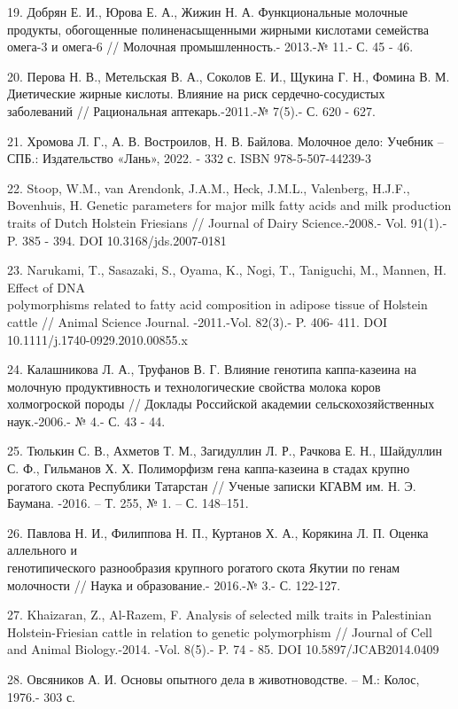 \begin{noparindent}
19. Добрян Е. И., Юрова Е. А., Жижин Н. А. Функциональные молочные
продукты, обогощенные полиненасыщенными жирными кислотами семейства
омега-3 и омега-6 // Молочная промышленность.- 2013.-№ 11.- С. 45 - 46.

20. Перова Н. В., Метельская В. А., Соколов Е. И., Щукина Г. Н., Фомина
В. М. Диетические жирные кислоты. Влияние на риск сердечно-сосудистых
заболеваний // Рациональная аптекарь.-2011.-№ 7(5).- С. 620 - 627.

21. Хромова Л. Г., А. В. Востроилов, Н. В. Байлова. Молочное дело:
Учебник -- СПБ.: Издательство «Лань», 2022. - 332 с. ISBN
978-5-507-44239-3

22. Stoop, W.M., van Arendonk, J.A.M., Heck, J.M.L., Valenberg, H.J.F.,
Bovenhuis, H. Genetic parameters for major milk fatty acids and milk
production traits of Dutch Holstein Friesians // Journal of Dairy
Science.-2008.- Vol. 91(1).-P. 385 - 394. DOI 10.3168/jds.2007-0181

23. Narukami, T., Sasazaki, S., Oyama, K., Nogi, T., Taniguchi, M.,
Mannen, H. Effect of DNA \\polymorphisms related to fatty acid composition
in adipose tissue of Holstein cattle // Animal Science Journal.
-2011.-Vol. 82(3).- P. 406- 411. DOI 10.1111/j.1740-0929.2010.00855.x


24. Калашникова Л. А., Труфанов В. Г. Влияние генотипа каппа-казеина на
молочную продуктивность и технологические свойства молока коров
холмогроской породы // Доклады Российской академии сельскохозяйственных
наук.-2006.- № 4.- С. 43 - 44.

25. Тюлькин С. В., Ахметов Т. М., Загидуллин Л. Р., Рачкова Е. Н.,
Шайдуллин С. Ф., Гильманов Х. Х. Полиморфизм гена каппа-казеина в стадах
крупно рогатого скота Республики Татарстан // Ученые записки КГАВМ им.
Н. Э. Баумана. -2016. -- Т. 255, № 1. -- С. 148--151.

26. Павлова Н. И., Филиппова Н. П., Куртанов Х. А., Корякина Л. П.
Оценка аллельного и \\генотипического разнообразия крупного рогатого скота
Якутии по генам молочности // Наука и образование.- 2016.-№ 3.- С.
122-127.

27. Khaizaran, Z., Al-Razem, F. Analysis of selected milk traits in
Palestinian Holstein-Friesian cattle in relation to genetic polymorphism
// Journal of Cell and Animal Biology.-2014. -Vol. 8(5).- P. 74 - 85. DOI 10.5897/JCAB2014.0409

28. Овсяников А. И. Основы опытного дела в животноводстве. -- М.: Колос,
1976.- 303 с.


\end{noparindent}
